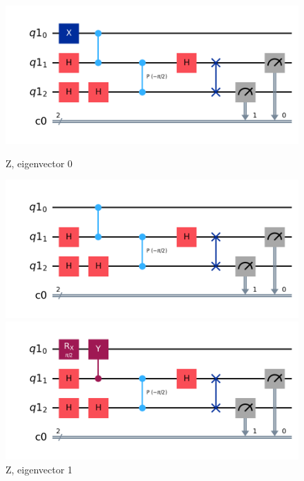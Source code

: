 \documentclass[12pt]{extarticle}
\begin{document}
\begin{figure}[htbp]
    \centering
    \begin{minipage}[b]{0.45\textwidth}
        \centering
        \includegraphics[width=\textwidth]{images/homework3_q2_qpe_z_e0.png}
        \captionsetup{labelformat=empty}
        \caption{Z, eigenvector 0}
    \end{minipage}
    \hfill
    \begin{minipage}[b]{0.45\textwidth}
        \centering
        \includegraphics[width=\textwidth]{images/homework3_q2_qpe_z_e1.png}
        \captionsetup{labelformat=empty}
        \caption{Z, eigenvector 1}
    \end{minipage}
    \vfill
    \begin{minipage}[b]{0.45\textwidth}
        \centering
        \includegraphics[width=\textwidth]{images/homework3_q2_qpe_y_e0.png}

\end{minipage}
\end{figure}
\end{document}
